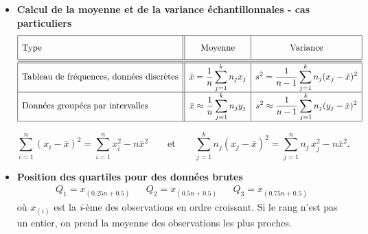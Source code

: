 \documentclass[12pt,french]{article}
\begin{document}
\begin{itemize}

\item
{\bf Calcul de la moyenne et de la variance échantillonnales - cas particuliers}
\begin{displaymath}
{\renewcommand{\arraystretch}{2}
\begin{array}{|l||c|c|}
\hline
\mbox{Type}& \mbox{Moyenne}& \mbox {Variance}\\[.10cm]


\hline\hline

\hline \mbox{Tableau de fréquences, données discrètes} &
\displaystyle \bar{x} = \frac{1}{n} \sum_{j=1}^{k}n_{j}x_{j}&
\displaystyle  s^{2} = \frac{1}{n-1}
\sum_{j=1}^{k}n_{j} (x_{j}-\bar{x})^{2}\\[.10cm]


\hline \mbox{Données groupées par intervalles} &
\displaystyle \bar{x} \approx \frac{1}{n} \sum_{j=1}^{k}n_{j}y_{j}&
\displaystyle  s^{2} \approx \frac{1}{n-1}
\sum_{j=1}^{k}n_{j} (y_{j}-\bar{x})^{2}\\[.10cm]
\hline


\end{array}}
\end{displaymath}


$$
\sum\limits_{i=1}^n (x_i-\bar{x})^2=\sum\limits_{i=1}^n
x_i^2-n\bar{x}^2 \; \; \; \; \; \;  \mbox{ et } \; \; \; \; \; \;  \sum\limits_{j=1}^k n_j
(x_j-\bar{x})^2= \sum\limits_{j=1}^n n_j\, x_j^2-n\bar{x}^2.
$$


\item {\bf Position des quartiles pour des données brutes}
\vspace{-0.2 cm}
\begin{align*}
    Q_1=x_{(0.25n + 0.5)} & & Q_2=x_{(0.5n + 0.5)} & & Q_3=x_{(0.75n + 0.5)}
\end{align*}
 où  $x_{(i)}$ est la {\it i}-ème des observations en ordre croissant. Si le rang n'est pas un entier, on prend la moyenne des observations les plus proches.
\vspace{0.2 cm}


\end{itemize}
\end{document}
